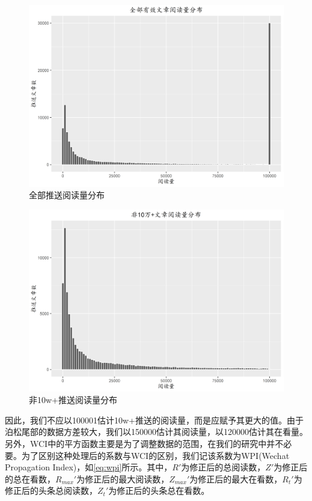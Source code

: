 \documentclass[a4paper,12pt,UTF8]{article}
\begin{document}
    \begin{figure}[htbp]
      \centering
      \includegraphics[width=0.9\linewidth]{allR.png}
      \caption{全部推送阅读量分布}
      \label{fig:allR}
    \end{figure}
    \begin{figure}[htbp]
      \centering
      \includegraphics[width=0.9\linewidth]{non10wR.png}
      \caption{非10w+推送阅读量分布}
      \label{fig:nonR}
    \end{figure}

    因此，我们不应以100001估计10w+推送的阅读量，而是应赋予其更大的值。由于泊松尾部的数据方差较大，我们以150000估计其阅读量，以120000估计其在看量。另外，WCI中的平方函数主要是为了调整数据的范围，在我们的研究中并不必要。为了区别这种处理后的系数与WCI的区别，我们记该系数为WPI(Wechat Propagation Index)，如\cref{eq:wpi}所示。其中，$R'$为修正后的总阅读数，$Z'$为修正后的总在看数，$R_{max}'$为修正后的最大阅读数，$Z_{max}'$为修正后的最大在看数，$R_t'$为修正后的头条总阅读数，$Z_t'$为修正后的头条总在看数。
\end{document}
